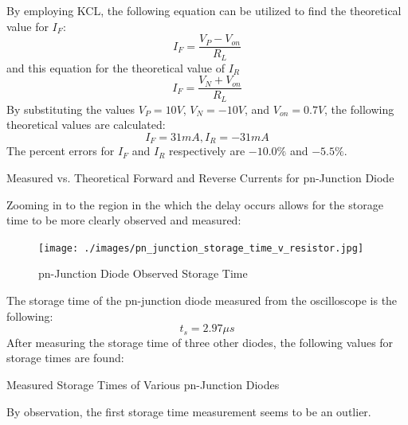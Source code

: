 By employing KCL, the following equation can be utilized to find the theoretical value for $I_F$:
\begin{equation}
\label{eq:if_theory}
I_F = \frac{V_P-V_{on}}{R_L}
\end{equation}
and this equation for the theoretical value of $I_R$
\begin{equation}
\label{eq:ir_theory}
I_F = \frac{V_N+V_{on}}{R_L}
\end{equation}
By substituting the values $V_P = 10V$, $V_N = -10V$, and $V_{on} = 0.7V$, the following theoretical values are calculated:
\begin{equation}
\label{eq:pn_theoretical_ifr}
I_{F}=31mA,I_{R}=-31mA
\end{equation}
The percent errors for $I_F$ and $I_R$ respectively are $-10.0\%$ and $-5.5\%$.
\FloatBarrier
\begin{table}[h!]
	\centering
	\caption{Measured vs. Theoretical Forward and Reverse Currents for pn-Junction Diode}
	\label{tab:pn_ifr}
\end{table}
\FloatBarrier

Zooming in to the region in the which the delay occurs allows for the storage time to be more clearly observed and measured:
\FloatBarrier
\begin{figure}[h!]
	\centering
	\texttt{[image: ./images/pn\_junction\_storage\_time\_v\_resistor.jpg]}
	\caption{pn-Junction Diode Observed Storage Time}
	\label{fig:pn_diode_t_s}
\end{figure}
\FloatBarrier
The storage time of the pn-junction diode measured from the oscilloscope is the following:
\begin{equation}
\label{eq:pn_measured_t_s}
t_{s}=2.97\mu s
\end{equation}
After measuring the storage time of three other diodes, the following values for storage times are found:
\FloatBarrier
\begin{table}[h!]
	\centering
	\caption{Measured Storage Times of Various pn-Junction Diodes}
	\label{tab:pn_ts}
\end{table}
\FloatBarrier
By observation, the first storage time measurement seems to be an outlier.

